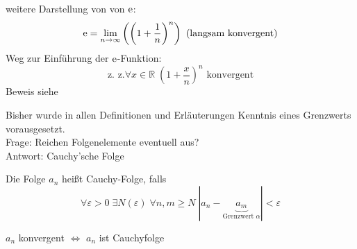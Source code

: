 \newpage
{}

\noindent weitere Darstellung von von $\operatorname{e}$:
\begin{equation*}
  \operatorname{e} = \lim_{n \rightarrow \infty} \left( \left(1+\frac 1 n\right)^n \right)\text{ (langsam konvergent)}
\end{equation*}
%
Weg zur Einführung der $\operatorname{e}$-Funktion:
\begin{equation*}
  \text{z. z.} \forall x \in \mathbb{R}\; \left( 1 + \frac x n \right)^n \text{ konvergent}
\end{equation*}
Beweis siehe \cite[S. 32]{bornemann}

\begin{note}
  Bisher wurde in allen Definitionen und Erläuterungen Kenntnis eines Grenzwerts vorausgesetzt.\\
  Frage: Reichen Folgenelemente eventuell aus?\\
  Antwort: Cauchy'sche Folge
\end{note}

\begin{definition}
  Die Folge $a_n$ heißt Cauchy-Folge, falls
  \[ \forall \varepsilon > 0\; \exists N(\varepsilon)\; \forall n,m \geq N\; |a_n-\underbrace{a_m}_{\text{Grenzwert } \alpha}| < \varepsilon \]
\end{definition}

\begin{proposition}
  $a_n$ konvergent $\Leftrightarrow$ $a_n$ ist Cauchyfolge
\end{proposition}

